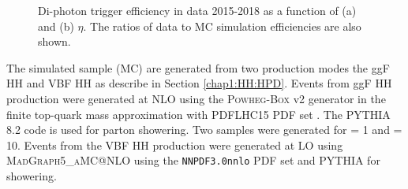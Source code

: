 \begin{figure}[htbp]
    \centering
    \caption{Di-photon trigger efficiency in data 2015-2018 as a function of (a) \eT and (b) $\eta$. The ratios of data to MC simulation efficiencies are also shown.}
    \label{fig:HHyybb:Data&MC:Trig}
\end{figure}
The simulated \HHyybb sample (MC) are generated from two production modes the ggF HH and VBF HH as describe in Section \ref{chap1:HH:HPD}. Events from ggF HH production were generated at NLO using the \textsc{Powheg-Box} v2 generator in the finite top-quark mass approximation with PDFLHC15 PDF set \cite{HH_FT, HH_Powheg, PDF4LHC}. The \textsc{PYTHIA} 8.2 code is used for parton showering. Two samples were generated for \kl= 1 and \kl= 10. Events from the VBF HH production were generated at LO  using \textsc{MadGraph5\_aMC@NLO} \cite{HH_VBF} using the \texttt{NNPDF3.0nnlo} PDF set \cite{VBF_PDF} and \textsc{PYTHIA} for showering. \\

